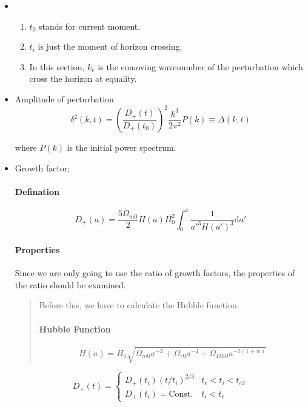 \begin{itemize}

\item
\begin{enumerate}
\item
$t_0$ stands for current moment.
\item
$t_i$ is just the moment of horizon crossing.
\item
In this section, $k_e$ is the comoving wavenumber of the perturbation which cross the horizon at equality.

\end{enumerate}


\item
Amplitude of perturbation
\begin{equation}
\delta^2(k,t)=\left(\frac{D_+(t)}{D_+(t_0)}\right)^2\frac{k^3}{2\pi^2}P(k)\equiv  \Delta(k,t)
\end{equation}

where $P(k)$ is the initial power spectrum.

\item
Growth factor;

\paragraph{Defination}  \begin{equation}
D_+(a)=\frac{5\Omega_{m0}}{2}H(a)H_0^2\int_0^a \frac{1}{a'^3H(a')^3}\mathrm da'
\end{equation}

\paragraph{Properties}
Since we are only going to use the ratio of growth factors, the properties of the ratio should be examined.

\begin{quote}
Before this, we have to calculate the Hubble function.
\paragraph{Hubble Function}\begin{equation}
H(a)=H_0 \sqrt{\Omega_{m0}a^{-3}+\Omega_{r0}a^{-4}+\Omega_{DE0}a^{-3(1+w)}}
\end{equation}
\end{quote}

\begin{equation}
D_+(t)=
\begin{cases}
D_+(t_i)(t/t_i)^{2/3} & t_e<t_i<t_{e2} \\
D_+(t_i)=\text{Const.} & t_i<t_e
\end{cases}
\end{equation}




\end{itemize}
